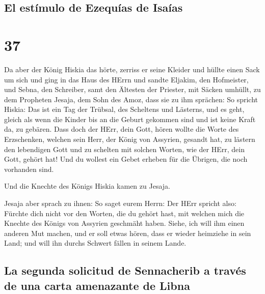 \hypertarget{el-estuxedmulo-de-ezequuxedas-de-isauxedas}{%
\subsection{El estímulo de Ezequías de
Isaías}\label{el-estuxedmulo-de-ezequuxedas-de-isauxedas}}

\hypertarget{section-36}{%
\section{37}\label{section-36}}

 Da aber der König Hiskia das hörte, zerriss er seine
Kleider und hüllte einen Sack um sich und ging in das Haus des HErrn
 und sandte Eljakim, den Hofmeister, und Sebna, den
Schreiber, samt den Ältesten der Priester, mit Säcken umhüllt, zu dem
Propheten Jesaja, dem Sohn des Amoz,  dass sie zu ihm
sprächen: So spricht Hiskia: Das ist ein Tag der Trübsal, des Scheltens
und Lästerns, und es geht, gleich als wenn die Kinder bis an die Geburt
gekommen sind und ist keine Kraft da, zu gebären.  Dass
doch der HErr, dein Gott, hören wollte die Worte des Erzschenken,
welchen sein Herr, der König von Assyrien, gesandt hat, zu lästern den
lebendigen Gott und zu schelten mit solchen Worten, wie der HErr, dein
Gott, gehört hat! Und du wollest ein Gebet erheben für die Übrigen, die
noch vorhanden sind.

 Und die Knechte des Königs Hiskia kamen zu Jesaja.

 Jesaja aber sprach zu ihnen: So saget eurem Herrn: Der
HErr spricht also: Fürchte dich nicht vor den Worten, die du gehört
hast, mit welchen mich die Knechte des Königs von Assyrien geschmäht
haben.  Siehe, ich will ihm einen anderen Mut machen, und
er soll etwas hören, dass er wieder heimziehe in sein Land; und will ihn
durchs Schwert fällen in seinem Lande.

\hypertarget{la-segunda-solicitud-de-sennacherib-a-travuxe9s-de-una-carta-amenazante-de-libna}{%
\subsection{La segunda solicitud de Sennacherib a través de una carta
amenazante de
Libna}\label{la-segunda-solicitud-de-sennacherib-a-travuxe9s-de-una-carta-amenazante-de-libna}}

